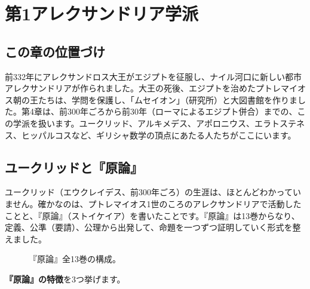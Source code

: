 \documentclass[a4paper,11pt,openany]{ltjsbook}
\begin{document}
\chapter{第1アレクサンドリア学派}

\section{この章の位置づけ}

前332年にアレクサンドロス大王がエジプトを征服し、ナイル河口に新しい都市アレクサンドリアが作られました。大王の死後、エジプトを治めたプトレマイオス朝の王たちは、学問を保護し、「ムセイオン」（研究所）と大図書館を作りました。第4章は、前300年ごろから前30年（ローマによるエジプト併合）までの、この学派を扱います。ユークリッド、アルキメデス、アポロニウス、エラトステネス、ヒッパルコスなど、ギリシャ数学の頂点にあたる人たちがここにいます。

\section{ユークリッドと『原論』}

ユークリッド（エウクレイデス、前300年ごろ）の生涯は、ほとんどわかっていません。確かなのは、プトレマイオス1世のころのアレクサンドリアで活動したことと、『原論』（ストイケイア）を書いたことです。『原論』は13巻からなり、定義、公準（要請）、公理から出発して、命題を一つずつ証明していく形式を整えました。

\begin{figure}[htbp]
\centering
{}
\caption{『原論』全13巻の構成。}
\end{figure}

\textbf{『原論』の特徴}を3つ挙げます。
\end{document}
